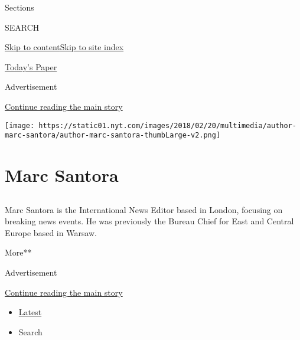 Sections

SEARCH

\protect\hyperlink{site-content}{Skip to
content}\protect\hyperlink{site-index}{Skip to site index}

\href{https://myaccount.nytimes.com/auth/login?response_type=cookie\&client_id=vi}{}

\href{https://www.nytimes.com/section/todayspaper}{Today's Paper}

Advertisement

\protect\hyperlink{after-top}{Continue reading the main story}

\texttt{[image: https://static01.nyt.com/images/2018/02/20/multimedia/author-marc-santora/author-marc-santora-thumbLarge-v2.png]}

\hypertarget{marc-santora}{%
\section{Marc Santora}\label{marc-santora}}

\subsection{}

Marc Santora is the International News Editor based in London, focusing
on breaking news events. He was previously the Bureau Chief for East and
Central Europe based in Warsaw.

More**

Advertisement

\protect\hyperlink{after-mid1}{Continue reading the main story}

\begin{itemize}
\tightlist
\item
  \protect\hyperlink{stream-panel}{Latest}
\item
  Search
\end{itemize}

